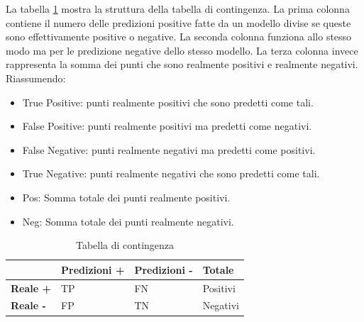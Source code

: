 La tabella \ref{contigency-table} mostra la struttura della tabella di contingenza.  La prima colonna contiene il numero delle predizioni positive fatte da un modello divise se queste sono effettivamente positive o negative. La seconda colonna funziona allo stesso modo ma per le predizione negative dello stesso modello. La terza colonna invece rappresenta la somma dei punti che sono realmente positivi e realmente negativi.
Riassumendo:
\begin{itemize}
\item True Positive: punti realmente positivi che sono predetti come tali.
\item False Positive: punti realmente positivi ma predetti come negativi.
\item False Negative: punti realmente negativi ma predetti come positivi.
\item True Negative: punti realmente negativi che sono predetti come tali.
\item Pos: Somma totale dei punti realmente positivi.
\item Neg: Somma totale dei punti realmente negativi.
\end{itemize}

\begin{table}[]
\centering
	\caption{\label{contigency-table}Tabella di contingenza}

\begin{tabular}{|l|l|l|l|}
\hline
                 & \textbf{Predizioni +} & \textbf{Predizioni -} & \textbf{Totale} \\ \hline
\textbf{Reale +} & TP                    & FN                    & Positivi        \\ \hline
\textbf{Reale -} & FP                    & TN                    & Negativi        \\ \hline
\end{tabular}
\end{table}


